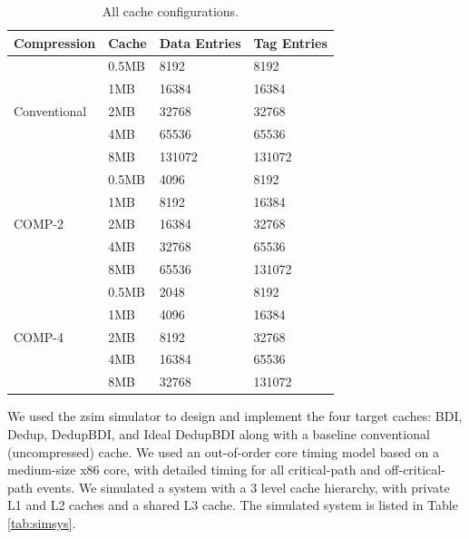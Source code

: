 \begin{table}[]
    \centering
    \begin{tabular}{|l|l|l|l|}
    \hline
    Compression                   & Cache & Data Entries & Tag Entries \\ \hline
    \multirow{5}{*}{Conventional} & 0.5MB & 8192         & 8192        \\ \cline{2-4} 
                                  & 1MB   & 16384        & 16384       \\ \cline{2-4} 
                                  & 2MB   & 32768        & 32768       \\ \cline{2-4} 
                                  & 4MB   & 65536        & 65536       \\ \cline{2-4} 
                                  & 8MB   & 131072       & 131072      \\ \hline
    \multirow{5}{*}{COMP-2}       & 0.5MB & 4096         & 8192        \\ \cline{2-4} 
                                  & 1MB   & 8192         & 16384       \\ \cline{2-4} 
                                  & 2MB   & 16384        & 32768       \\ \cline{2-4} 
                                  & 4MB   & 32768        & 65536       \\ \cline{2-4} 
                                  & 8MB   & 65536        & 131072      \\ \hline
    \multirow{5}{*}{COMP-4}       & 0.5MB & 2048         & 8192        \\ \cline{2-4} 
                                  & 1MB   & 4096         & 16384       \\ \cline{2-4} 
                                  & 2MB   & 8192         & 32768       \\ \cline{2-4} 
                                  & 4MB   & 16384        & 65536       \\ \cline{2-4} 
                                  & 8MB   & 32768        & 131072      \\ \hline
    \end{tabular}
    \caption{All cache configurations.}
    \label{tab:simcache}
\end{table}
We used the zsim\cite{zsim} simulator to design and implement the four target caches: BDI, Dedup, DedupBDI, and Ideal DedupBDI along with a baseline conventional (uncompressed) cache. We used an out-of-order core timing model based on a medium-size x86 core, with detailed timing for all critical-path and off-critical-path events. We simulated a system with a 3 level cache hierarchy, with private L1 and L2 caches and a shared L3 cache. The simulated system is listed in Table \ref{tab:simsys}.\par 
